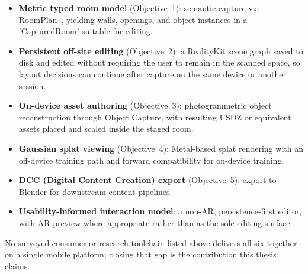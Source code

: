 \begin{itemize}
  \item \textbf{Metric typed room model} (Objective~1): semantic capture via
        RoomPlan~\cite{apple2024roomplan2}, yielding walls, openings, and
        object instances in a 'CapturedRoom' suitable for editing.
  \item \textbf{Persistent off-site editing} (Objective~2): a RealityKit
        scene graph saved to disk and edited without requiring the user to
        remain in the scanned space, so layout decisions can continue after
        capture on the same device or another session.
  \item \textbf{On-device asset authoring} (Objective~3): photogrammetric
        object reconstruction through Object Capture, with resulting USDZ or
        equivalent assets placed and scaled inside the staged room.
  \item \textbf{Gaussian splat viewing} (Objective~4): Metal-based splat
        rendering with an off-device training path and forward compatibility
        for on-device training.
  \item \textbf{DCC (Digital Content Creation) export} (Objective~5): export to Blender for downstream
        content pipelines.
  \item \textbf{Usability-informed interaction model}: a non-AR,
        persistence-first editor,
        with AR preview where appropriate rather than as the sole editing surface.
\end{itemize}

No surveyed consumer or research toolchain listed above delivers all six
together on a single mobile platform; closing that gap is the contribution
this thesis claims.
